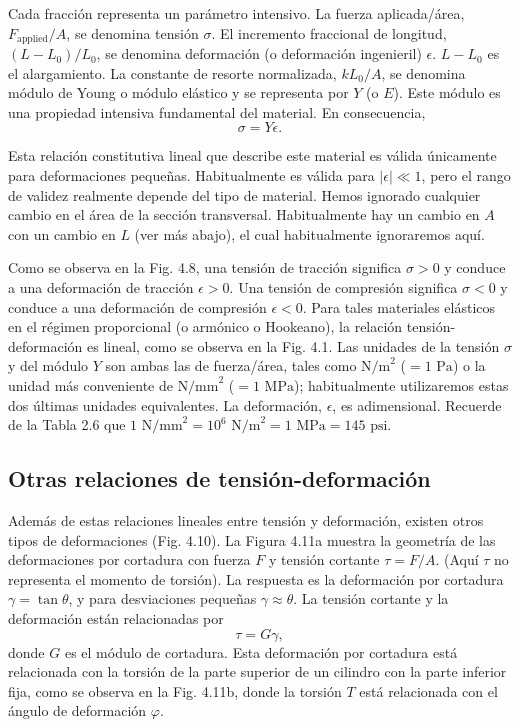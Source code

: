 \documentclass[12pt]{book}
\begin{document}
Cada fracción representa un parámetro intensivo. La fuerza aplicada/área, $F_{\text{applied}}/A$, se denomina tensión $\sigma$. El incremento fraccional de longitud, $(L - L_0)/L_0$, se denomina deformación (o deformación ingenieril) $\epsilon$. $L - L_0$ es el alargamiento. La constante de resorte normalizada, $k L_0/A$, se denomina módulo de Young o módulo elástico y se representa por $Y$ (o $E$). Este módulo es una propiedad intensiva fundamental del material. En consecuencia,
\begin{equation}
\sigma = Y \epsilon.
\label{eq:4.5}
\end{equation}

Esta relación constitutiva lineal que describe este material es válida únicamente para deformaciones pequeñas. Habitualmente es válida para $|\epsilon| \ll 1$, pero el rango de validez realmente depende del tipo de material. Hemos ignorado cualquier cambio en el área de la sección transversal. Habitualmente hay un cambio en $A$ con un cambio en $L$ (ver más abajo), el cual habitualmente ignoraremos aquí.

Como se observa en la Fig. 4.8, una tensión de tracción significa $\sigma > 0$ y conduce a una deformación de tracción $\epsilon > 0$. Una tensión de compresión significa $\sigma < 0$ y conduce a una deformación de compresión $\epsilon < 0$. Para tales materiales elásticos en el régimen proporcional (o armónico o Hookeano), la relación tensión-deformación es lineal, como se observa en la Fig. 4.1. Las unidades de la tensión $\sigma$ y del módulo $Y$ son ambas las de fuerza/área, tales como $\text{N/m}^2$ ($= 1\text{ Pa}$) o la unidad más conveniente de $\text{N/mm}^2$ ($= 1\text{ MPa}$); habitualmente utilizaremos estas dos últimas unidades equivalentes. La deformación, $\epsilon$, es adimensional. Recuerde de la Tabla 2.6 que $1\text{ N/mm}^2 = 10^6\text{ N/m}^2 = 1\text{ MPa} = 145\text{ psi}$.

\subsection{Otras relaciones de tensión-deformación}

Además de estas relaciones lineales entre tensión y deformación, existen otros tipos de deformaciones (Fig. 4.10). La Figura 4.11a muestra la geometría de las deformaciones por cortadura con fuerza $F$ y tensión cortante $\tau = F/A$. (Aquí $\tau$ no representa el momento de torsión). La respuesta es la deformación por cortadura $\gamma = \tan\theta$, y para desviaciones pequeñas $\gamma \approx \theta$. La tensión cortante y la deformación están relacionadas por
\begin{equation}
\tau = G \gamma,
\label{eq:4.6}
\end{equation}
donde $G$ es el módulo de cortadura. Esta deformación por cortadura está relacionada con la torsión de la parte superior de un cilindro con la parte inferior fija, como se observa en la Fig. 4.11b, donde la torsión $T$ está relacionada con el ángulo de deformación $\varphi$.
\end{document}
